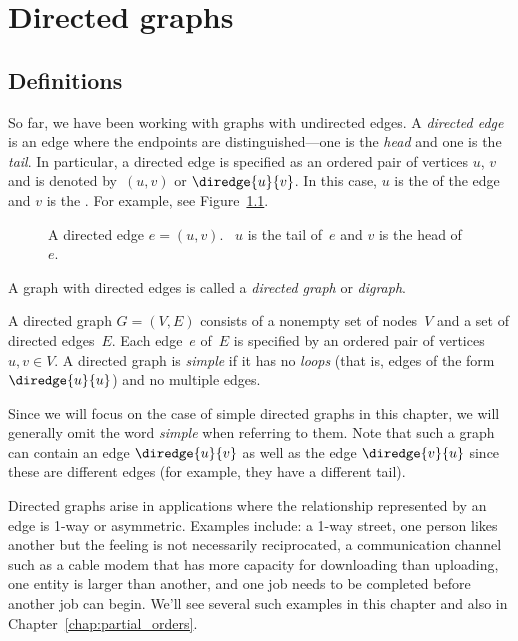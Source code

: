 \chapter{Directed graphs}\label{chap:digraphs}

\section{Definitions}

So far, we have been working with graphs with undirected edges.  A
\emph{directed edge} is an edge where the endpoints are
distinguished---one is the \emph{head} and one is the \emph{tail}.  In
particular, a directed edge is specified as an ordered pair of
vertices $u$, $v$ and is denoted by~$(u, v)$ or $\diredge{u}{v}$.  In this
case, $u$ is the  of the edge and $v$ is the .
For example, see Figure~\ref{fig:6EA}.

\begin{figure}


\caption{A directed edge $e = (u, v)$.  \ $u$ is the tail of~$e$ and
  $v$ is the head of~$e$.}

\label{fig:6EA}
\end{figure}

A graph with directed edges is called a \emph{directed graph} or
\emph{digraph}.

\begin{definition}\label{def:digraph}
A directed graph $G = (V, E)$ consists of a nonempty set of nodes~$V$
and a set of directed edges~$E$.  Each edge~$e$ of~$E$ is specified by
an ordered pair of vertices $u, v \in V$.  A directed graph
is \emph{simple} if it has no \emph{loops} (that is, edges of the form
$\diredge{u}{u}$) and no multiple edges.
\end{definition}

Since we will focus on the case of simple directed graphs in this
chapter, we will generally omit the word \emph{simple} when referring
to them.  Note that such a graph can contain an edge $\diredge{u}{v}$
as well as the edge $\diredge{v}{u}$ since these are different edges
(for example, they have a different tail).

Directed graphs arise in applications where the relationship
represented by an edge is 1-way or asymmetric.  Examples include: a
1-way street, one person likes another but the feeling is not
necessarily reciprocated, a communication channel such as a cable
modem that has more capacity for downloading than uploading, one
entity is larger than another, and one job needs to be completed
before another job can begin. We'll see several such examples in this
chapter and also in Chapter~\ref{chap:partial_orders}.

